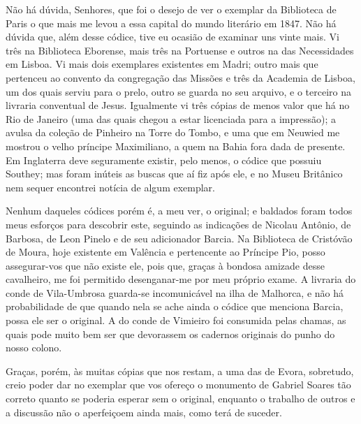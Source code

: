Não há dúvida, Senhores, que foi o desejo de ver o exemplar da 
Biblioteca de Paris o que mais me levou a essa capital do mundo 
literário em 1847. Não há dúvida que, além desse códice, tive eu ocasião 
de examinar uns vinte mais. Vi três na Biblioteca Eborense, mais três na 
Portuense e outros na das Necessidades em Lisboa. Vi mais dois 
exemplares existentes em Madri; outro mais que pertenceu ao convento 
da congregação das Missões e três da Academia de Lisboa, um dos 
quais serviu para o prelo, outro se guarda no seu arquivo, e o terceiro na 
livraria conventual de Jesus. Igualmente vi três cópias de menos valor 
que há no Rio de Janeiro (uma das quais chegou a estar licenciada para a 
impressão); a avulsa da coleção de Pinheiro na Torre do Tombo, e uma 
que em Neuwied me mostrou o velho príncipe Maximiliano, a quem na 
Bahia fora dada de presente. Em Inglaterra deve seguramente existir, 
pelo menos, o códice que possuiu Southey; mas foram inúteis as buscas 
que aí fiz após ele, e no Museu Britânico nem sequer encontrei notícia 
de algum exemplar.

Nenhum daqueles códices porém é, a meu ver, o original; e 
baldados foram todos meus esforços para descobrir este, seguindo as 
indicações de Nicolau Antônio, de Barbosa, de Leon Pinelo e de seu 
adicionador Barcia. Na Biblioteca de Cristóvão de Moura, hoje existente 
em Valência e pertencente ao Príncipe Pio, posso assegurar-vos que não 
existe ele, pois que, graças à bondosa amizade desse cavalheiro, me foi 
permitido desenganar-me por meu próprio exame. A livraria do conde 
de Vila-Umbrosa guarda-se incomunicável na ilha de Malhorca, e não 
há probabilidade de que quando nela se ache ainda o códice que 
menciona Barcia, possa ele ser o original. A do conde de Vimieiro foi 
consumida pelas chamas, as quais pode muito bem ser que devorassem 
os cadernos originais do punho do nosso colono.

Graças, porém, às muitas cópias que nos restam, a uma das de 
Evora, sobretudo, creio poder dar no exemplar que vos ofereço o 
monumento de Gabriel Soares tão correto quanto se poderia esperar sem 
o original, enquanto o trabalho de outros e a discussão não o 
aperfeiçoem ainda mais, como terá de suceder.

